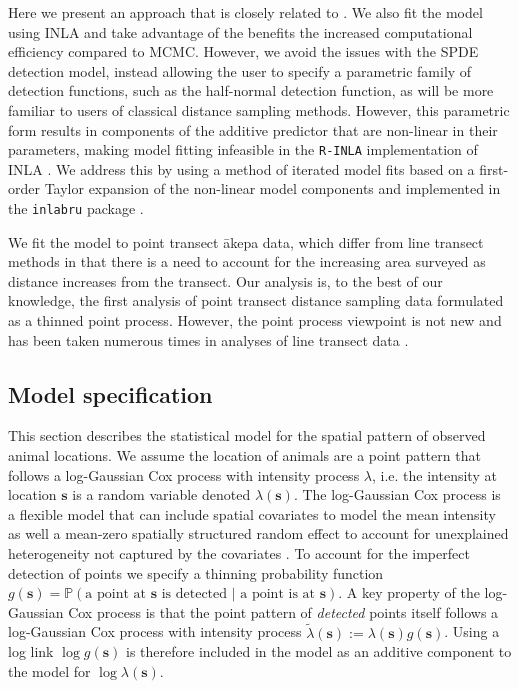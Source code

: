 \documentclass{stylefile16/statsoc}
\newcommand{\bs}{\mathbf{s}}
\newcommand{\tl}{\tilde{\lambda}}   %
\newcommand{\akepa}{\textquotesingle\={a}kepa}  %
\begin{document}
Here we present an approach that is closely related to \citet{yuan_point_2017}.  We also fit the model using INLA and take advantage of the benefits the increased computational efficiency compared to MCMC.  However, we avoid the issues with the SPDE detection model, instead allowing the user to specify a parametric family of detection functions, such as the half-normal detection function, as will be more familiar to users of classical distance sampling methods. However, this parametric form results in components of the additive predictor that are non-linear in their parameters, making model fitting infeasible in the \texttt{R-INLA} implementation of INLA \citep{rue_approximate_2009}.  We address this by using a method of iterated model fits based on a first-order Taylor expansion of the non-linear model components and implemented in the \texttt{inlabru} package \citep{bachl_inlabru_2019}.

We fit the model to point transect \akepa{} data, which differ from line transect methods in that there is a need to account for the increasing area surveyed as distance increases from the transect.  Our analysis is, to the best of our knowledge, the first analysis of point transect distance sampling data formulated as a thinned point process.  However, the point process viewpoint is not new and has been taken numerous times in analyses of line transect data \citep{buckland_model-based_2016, niemi_bayesian_2010, johnson_model-based_2010, waagepetersen_likelihood-based_2006, hedley_spatial_2004,  hogmander_random_1991, stoyan_remark_1982}.

\vfill

\subsection{Model specification}

This section describes the statistical model for the spatial pattern of observed animal locations. We assume the location of animals are a point pattern that follows a log-Gaussian Cox process with intensity process $\lambda$, i.e.  the intensity at location $\bs$ is a random variable denoted $\lambda(\bs)$.  The log-Gaussian Cox process is a flexible model that can include spatial covariates to model the mean intensity as well a mean-zero spatially structured random effect to account for unexplained heterogeneity not captured by the covariates \citep{moller_log_1998}.  To account for the imperfect detection of points we specify a thinning probability function $g(\bs) = \mathbb{P}(\text{a point at $\bs$ is detected } |\text{ a point is at $\bs$})$. A key property of the log-Gaussian Cox process is that the point pattern of \textit{detected} points itself follows a log-Gaussian Cox process with intensity process $\tl(\bs) := \lambda(\bs)g(\bs)$.  Using a log link $\log g(\bs)$ is therefore included in the model as an additive component to the model for $\log \lambda(\bs)$.  
\end{document}
